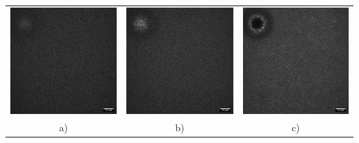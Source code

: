 \begin{table}[h!]
	\begin{tabular}{ccc}
		\includegraphics[width= .33\linewidth]{Chapters/Figures/190215_g91_glass_sphere011_cascade1.png} & \includegraphics[width= .33\linewidth]{Chapters/Figures/190215_g91_glass_sphere011_cascade2.png} & \includegraphics[width= .33\linewidth]{Chapters/Figures/190215_g91_glass_sphere011_cascade3.png} 
		\\
		a) & b) & c) \\

\end{tabular}
\end{table}
